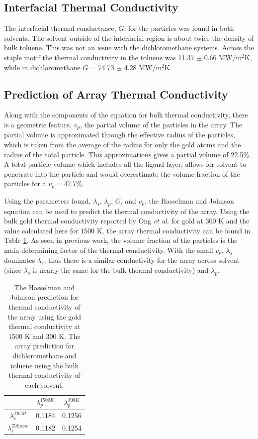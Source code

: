 \subsection{Interfacial Thermal Conductivity}
The interfacial thermal conductance, $G$, for the particles was found in both solvents.
The solvent outside of the interfacial region is about twice the density of bulk toluene.
This was not an issue with the dichloromethane systems. 
Across the staple motif the thermal conductivity in the toluene was 11.37 $\pm$ 0.66 MW/m$^2$K, while in dichloromethane $G$ = 74.73 $\pm$ 4.28 MW/m$^2$K.

\subsection{Prediction of Array Thermal Conductivity}
Along with the components of the equation for bulk thermal conductivity, there is a geometric feature, $v_p$, the partial volume of the  particles in the array.
The partial volume is approximated through the effective radius of the particles, which is taken from the average of the radius for only the gold atoms and the radius of the total particle.
This approximations gives a partial volume of 22.5\%.
A total particle volume which includes all the ligand layer, allows for solvent to penetrate into the particle and would overestimate the volume fraction of the particles for a $v_p = 47.7\%$.

Using the parameters found, $\lambda_s$, $\lambda_p$, $G$, and $v_p$, the Hasselman and Johnson equation can be used to predict the thermal conductivity of the array.
Using the bulk gold thermal conductivity reported by Ong \textit{et al.} for gold at 300 K and the value calculated here for 1500 K, the array thermal conductivity can be found in Table \ref{tab:predition}.
As seen in previous work,\cite{Ong:2014yq, Liu2015, Zanjani2014} the volume fraction of the particles is the main determining factor of the thermal conductivity. 
With the small $v_p$, $\lambda_s$ dominates $\lambda_e$, thus there is a similar conductivity for the array across solvent (since $\lambda_s$ is nearly the same for the bulk thermal conductivity) and $\lambda_p$.

\begin{table}[]
    \centering
    \begin{tabular}{c|c|c}
    \toprule
         &$\lambda_p^{1500 K}$ & $\lambda_p^{300 K}$  \\
         \hline
         $\lambda_e^{DCM}$& 0.1184& 0.1256\\
         $\lambda_e^{Toluene}$ & 0.1182 & 0.1254 \\
         \bottomrule
    \end{tabular}
    \caption{The Hasselman and Johnson prediction for thermal conductivity of the  array using the gold thermal conductivity at 1500 K and 300 K. The array prediction for dichloromethane and toluene using the bulk thermal conductivity of each solvent.}
    \label{tab:predition}
\end{table}


